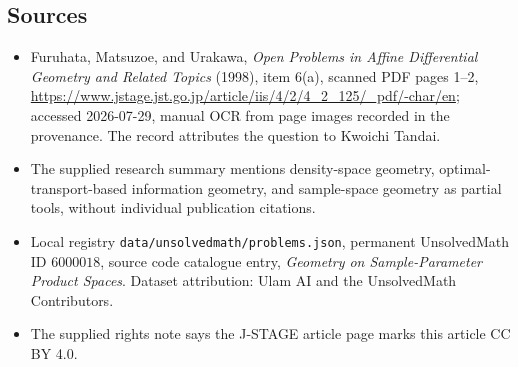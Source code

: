 \documentclass[11pt]{article}
\begin{document}
\subsection{Sources}
\begin{itemize}
\item Furuhata, Matsuzoe, and Urakawa, \emph{Open Problems in Affine Differential Geometry and Related Topics} (1998), item 6(a), scanned PDF pages 1--2, \url{https://www.jstage.jst.go.jp/article/iis/4/2/4_2_125/_pdf/-char/en}; accessed 2026-07-29, manual OCR from page images recorded in the provenance. The record attributes the question to Kwoichi Tandai.
\item The supplied research summary mentions density-space geometry, optimal-transport-based information geometry, and sample-space geometry as partial tools, without individual publication citations.
\item Local registry \texttt{data/unsolvedmath/problems.json}, permanent UnsolvedMath ID $6000018$, source code catalogue entry, \emph{Geometry on Sample-Parameter Product Spaces}. Dataset attribution: Ulam AI and the UnsolvedMath Contributors.
\item The supplied rights note says the J-STAGE article page marks this article CC BY 4.0.
\end{itemize}
\end{document}

